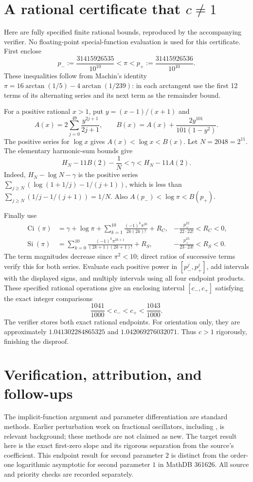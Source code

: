 \documentclass[11pt]{article}
\newcommand{\Si}{\operatorname{Si}}
\newcommand{\Ci}{\operatorname{Ci}}
\begin{document}
\section*{A rational certificate that $c\ne1$}
Here are fully specified finite rational bounds, reproduced by the
accompanying verifier. No floating-point special-function evaluation
is used for this certificate. First enclose
\[
 p_-:=\frac{31415926535}{10^{10}}<\pi<
 p_+:=\frac{31415926536}{10^{10}}.
\]
These inequalities follow from Machin's identity
$\pi=16\arctan(1/5)-4\arctan(1/239)$: in each arctangent use
the first 12 terms of its alternating series and its next term
as the remainder bound.

For a positive rational $x>1$, put $y=(x-1)/(x+1)$ and
\[
 A(x)=2\sum_{j=0}^{49}\frac{y^{2j+1}}{2j+1},\qquad
 B(x)=A(x)+\frac{2y^{101}}{101(1-y^2)}.
\]
The positive series for $\log x$ gives $A(x)<\log x<B(x)$.
Let $N=2048=2^{11}$. The elementary harmonic-sum bounds give
\[
 H_N-11B(2)-\frac1N<\gamma<H_N-11A(2).
\]
Indeed, $H_N-\log N-\gamma$ is the positive series
$\sum_{j\geq N}(\log(1+1/j)-1/(j+1))$, which is less than
$\sum_{j\geq N}(1/j-1/(j+1))=1/N$.
Also $A(p_-)<\log\pi<B(p_+)$.

Finally use
\begin{align*}
 \Ci(\pi)&=\gamma+\log\pi+
       \sum_{k=1}^{10}\frac{(-1)^k\pi^{2k}}{2k(2k)!}+R_C,
 &-\frac{p_+^{22}}{22\cdot22!}<R_C<0,\\
 \Si(\pi)&=\sum_{k=0}^{10}
       \frac{(-1)^k\pi^{2k+1}}{(2k+1)(2k+1)!}+R_S,
 &-\frac{p_+^{23}}{23\cdot23!}<R_S<0.
\end{align*}
The term magnitudes decrease since $\pi^2<10$; direct ratios of
successive terms verify this for both series. Evaluate each positive
power in $[p_-^j,p_+^j]$, add intervals with the displayed signs,
and multiply intervals using all four endpoint products. These
specified rational operations give an enclosing interval
$[c_-,c_+]$ satisfying the exact integer comparisons
\[
 \frac{1041}{1000}<c_-<c_+<\frac{1043}{1000}.
\]
The verifier stores both exact rational endpoints. For orientation
only, they are approximately $1.041302284865325$ and
$1.042069276032071$. Thus $c>1$ rigorously, finishing the disproof.

\section*{Verification, attribution, and follow-ups}
The implicit-function argument and parameter differentiation are
standard methods. Earlier perturbation work on fractional oscillators,
including \cite{TZ}, is relevant background; these methods are not
claimed as new. The target result here is the exact first-zero slope
and its rigorous separation from the source's coefficient. This
endpoint result for second parameter $2$ is distinct from the
order-one logarithmic asymptotic for second parameter $1$ in MathDB
361626. All source and priority checks are recorded separately.
\end{document}
